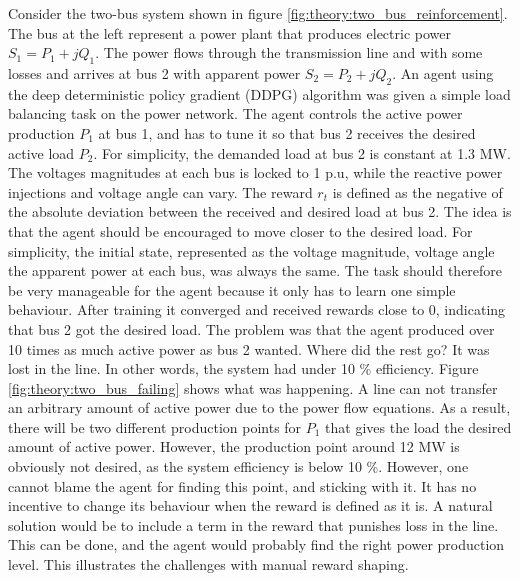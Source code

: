 \documentclass[class=book, crop=false, 11pt]{standalone}
\begin{document}
Consider the two-bus system shown in figure \ref{fig:theory:two_bus_reinforcement}. The bus at the left represent a power plant that produces electric power $S_{1} = P_{1} + jQ_{1}$. The power flows through the transmission line and with some losses and arrives at bus 2 with apparent power $S_{2} = P_{2} + jQ_{2}$. An agent using the deep deterministic policy gradient (DDPG) algorithm was given a simple load balancing task on the power network. The agent controls the active power production $P_{1}$ at bus 1, and has to tune it so that bus 2 receives the desired active load $P_{2}$. For simplicity, the demanded load at bus 2 is constant at 1.3 MW. The voltages magnitudes at each bus is locked to 1 p.u, while the reactive power injections and voltage angle can vary. The reward $r_{t}$ is defined as the negative of the absolute deviation between the received and desired load at bus 2. The idea is that the agent should be encouraged to move closer to the desired load. For simplicity, the initial state, represented as the voltage magnitude, voltage angle the apparent power at each bus, was always the same. The task should therefore be very manageable for the agent because it only has to learn one simple behaviour. After training it converged and received rewards close to 0, indicating that bus 2 got the desired load. The problem was that the agent produced over 10 times as much active power as bus 2 wanted. Where did the rest go? It was lost in the line. In other words, the system had under 10 \% efficiency. Figure \ref{fig:theory:two_bus_failing} shows what was happening. A line can not transfer an arbitrary amount of active power due to the power flow equations. As a result, there will be two different production points for $P_{1}$ that gives the load the desired amount of active power. However, the production point around 12 MW is obviously not desired, as the system efficiency is below 10 \%. However, one cannot blame the agent for finding this point, and sticking with it. It has no incentive to change its behaviour when the reward is defined as it is. A natural solution would be to include a term in the reward that punishes loss in the line. This can be done, and the agent would probably find the right power production level. This illustrates the challenges with manual reward shaping. 
\end{document}
